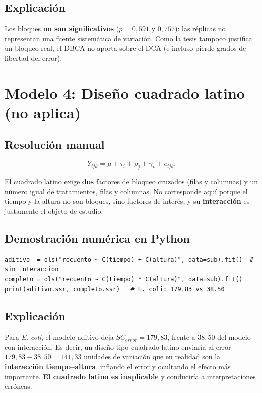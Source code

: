 \documentclass[12pt,a4paper]{article}
\begin{document}
\subsection{Explicación}

Los bloques \textbf{no son significativos} ($p=0{,}591$ y $0{,}757$): las réplicas no representan una fuente sistemática de variación. Como la tesis tampoco justifica un bloqueo real, el DBCA no aporta sobre el DCA (e incluso pierde grados de libertad del error).

\section{Modelo 4: Diseño cuadrado latino (no aplica)}

\subsection{Resolución manual}

\[
Y_{ijk} = \mu + \tau_i + \rho_j + \gamma_k + e_{ijk}.
\]

El cuadrado latino exige \textbf{dos} factores de bloqueo cruzados (filas y columnas) y un número igual de tratamientos, filas y columnas. No corresponde aquí porque el tiempo y la altura no son bloques, sino factores de interés, y su \textbf{interacción} es justamente el objeto de estudio.

\subsection{Demostración numérica en Python}

\begin{lstlisting}[caption={Comparación de un modelo aditivo (estilo cuadrado latino) vs.\ con interacción.}]
aditivo  = ols("recuento ~ C(tiempo) + C(altura)", data=sub).fit()  # sin interaccion
completo = ols("recuento ~ C(tiempo) * C(altura)", data=sub).fit()
print(aditivo.ssr, completo.ssr)   # E. coli: 179.83 vs 38.50
\end{lstlisting}

\subsection{Explicación}

Para \textit{E. coli}, el modelo aditivo deja $SC_{error}=179{,}83$, frente a $38{,}50$ del modelo con interacción. Es decir, un diseño tipo cuadrado latino enviaría al error $179{,}83-38{,}50=141{,}33$ unidades de variación que en realidad son la \textbf{interacción tiempo--altura}, inflando el error y ocultando el efecto más importante. \textbf{El cuadrado latino es inaplicable} y conduciría a interpretaciones erróneas.
\end{document}
